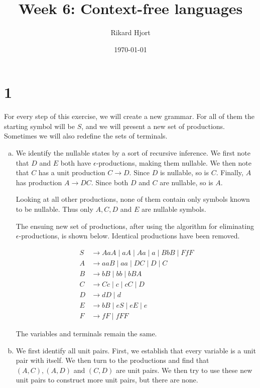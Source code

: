 \documentclass{article}
\title{Week 6: Context-free languages}
\date{\today}
\author{Rikard Hjort}
\begin{document}
\maketitle

\section*{1}

    For every step of this exercise, we will create a new grammar. For all of them the starting symbol will be $S$, and we will present a new set of productions. Sometimes we will also redefine the sets of terminals.

\begin{enumerate}[(a)]

    \item
        We identify the nullable states by a sort of recursive inference. We first note that $D$ and $E$ both have $\epsilon$-productions, making them nullable. We then note that $C$ has a unit production $C \to D$. Since $D$ is nullable, so is $C$. Finally, $A$ has production $A \to DC$. Since both $D$ and $C$ are nullable, so is $A$. 

        Looking at all other productions, none of them contain only symbols known to be nullable. Thus only $A,C,D$ and $E$ are nullable symbols.

        The ensuing new set of productions, after using the algorithm for eliminating $\epsilon$-productions, is shown below. Identical productions have been removed.

        \begin{align*}
            S &\to AaA \mid aA \mid Aa \mid a \mid BbB \mid FfF \\
            A &\to aaB \mid aa \mid DC \mid D \mid C \\
            B &\to bB \mid bb \mid bBA \\
            C &\to Cc \mid c \mid cC \mid D \\
            D &\to dD \mid d \\
            E &\to bB \mid eS \mid eE \mid e \\
            F &\to fF \mid fFF
        \end{align*}
        
       The variables and terminals remain the same. 

    \item
        We first identify all unit pairs. First, we establish that every variable is a unit pair with itself. We then turn to the productions and find that $(A,C),(A,D)$ and $(C,D)$ are unit pairs. We then try to use these new unit pairs to construct more unit pairs, but there are none.


\end{enumerate}
\end{document}
